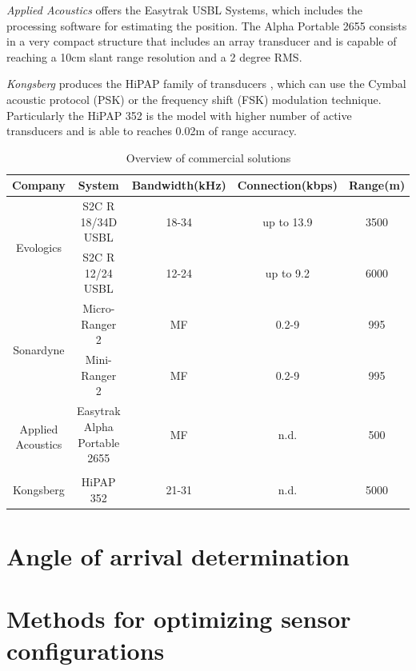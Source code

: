 \textit{Applied Acoustics} offers the Easytrak USBL Systems, which includes the processing software for estimating the position. The Alpha Portable 2655 consists in a very compact structure that includes an array transducer and is capable of reaching a 10cm slant range resolution and a 2 degree RMS.

\textit{Kongsberg} produces the HiPAP family of transducers \cite{hipap_hardw}, which can use the Cymbal acoustic protocol (PSK) or the frequency shift (FSK) modulation technique. Particularly the HiPAP 352 is the model with higher number of active transducers and is able to reaches 0.02m of range accuracy.

\begin{table}[H] %
	\begin{tabular}{|c|c|c c c|}
		\hline
		Company
		& System
		& Bandwidth(kHz)
		& Connection(kbps)
		& Range(m) \\ \hline 
		\multirow{2}{4em}{Evologics} 
		& S2C R 18/34D USBL & 18-34 & up to 13.9 & 3500\\
		& S2C R 12/24 USBL & 12-24 & up to 9.2 & 6000\\
		\hline 
		\multirow{2}{4em}{Sonardyne} 
		& Micro-Ranger 2 & MF & 0.2-9 & 995\\
		& Mini-Ranger 2 & MF & 0.2-9 & 995\\ 
		\hline 
		\multirow{2}{4em}{Applied Acoustics} 
		& Easytrak Alpha Portable 2655 & MF & n.d. & 500 \\
		&  &  &  & \\
		\hline 
		\multirow{1}{4em}{Kongsberg} 
		& HiPAP 352 & 21-31 & n.d. & 5000 \\
		\hline 
	\end{tabular}
	\caption{Overview of commercial solutions}
	\label{tab:solutions}
\end{table}



\section{Angle of arrival determination}

\section{Methods for optimizing sensor configurations }

